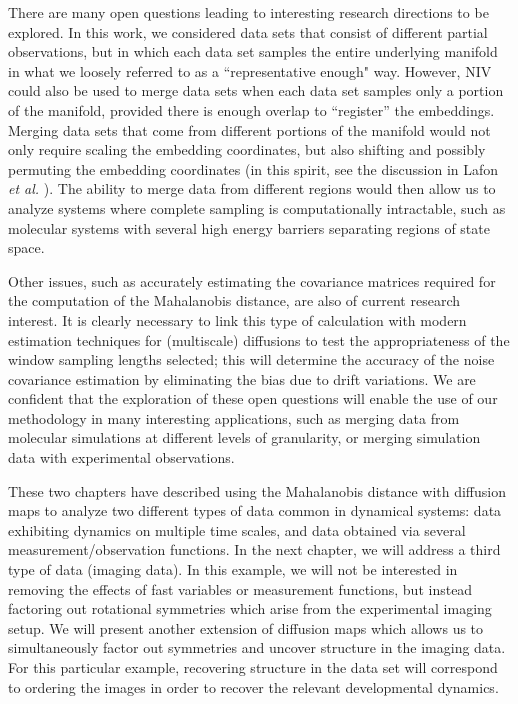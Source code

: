 There are many open questions leading to interesting research directions to be explored.
%
In this work, we considered data sets that consist of different partial observations, but in which each data set samples the entire underlying manifold in
what we loosely referred to as a ``representative enough" way.
%
However, NIV could also be used to merge data sets when each data set samples only a portion of the manifold, provided there is enough overlap to ``register'' the embeddings.
%
Merging data sets that come from different portions of the manifold would not only require scaling the embedding coordinates,
but also shifting and possibly permuting the embedding coordinates (in this spirit, see the discussion in Lafon {\em et al.} \cite{lafon2006data}).
%
The ability to merge data from different regions would then allow us to analyze systems where complete sampling is computationally intractable,
such as molecular systems with several high energy barriers separating regions of state space.

Other issues, such as accurately estimating the covariance matrices required for the computation of the Mahalanobis distance, are also of current research interest.
%
It is clearly necessary to link this type of calculation with modern estimation techniques for (multiscale) diffusions \cite{ait2002maximum, ait2003effects, ait2008closed}
to test the appropriateness of the window sampling lengths selected; this will determine the accuracy of the noise covariance estimation by eliminating
the bias due to drift variations.
%
We are confident that the exploration of these open questions will enable the use of our methodology in many interesting applications, such as merging data from molecular simulations at different levels of granularity, or merging simulation data with experimental observations.

These two chapters have described using the Mahalanobis distance with diffusion maps to analyze two different types of data common in dynamical systems: data exhibiting dynamics on multiple time scales, and data obtained via several measurement/observation functions.
%
In the next chapter, we will address a third type of data (imaging data).
%
In this example, we will not be interested in removing the effects of fast variables or measurement functions, but instead factoring out rotational symmetries which arise from the experimental imaging setup.
%
We will present another extension of diffusion maps which allows us to simultaneously factor out symmetries and uncover structure in the imaging data.
%
For this particular example, recovering structure in the data set will correspond to ordering the images in order to recover the relevant developmental dynamics.


